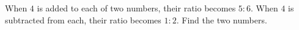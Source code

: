 When $4$ is added to each of two numbers, their ratio becomes $5:6$. When $4$ is subtracted from each, their ratio becomes $1:2$. Find the two numbers.
